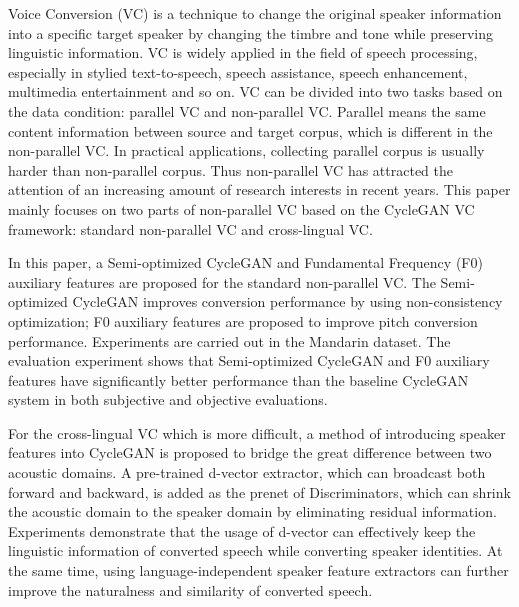 \begin{enabstract}
  Voice Conversion (VC) is a technique to change the original speaker information 
  into a specific target speaker by changing the timbre and tone while preserving 
  linguistic information. VC is widely applied in the field of speech processing, 
  especially in stylied text-to-speech, speech assistance, speech enhancement, 
  multimedia entertainment and so on. VC can be divided into two tasks based on the 
  data condition: parallel VC and non-parallel VC. Parallel means the same content
  information between source and target corpus, which is different in the non-parallel VC.
  In practical applications, collecting parallel corpus is usually harder than non-parallel
  corpus. Thus non-parallel VC has attracted the attention of an increasing amount of research 
  interests in recent years. This paper mainly focuses on two parts of non-parallel VC based
  on the CycleGAN VC framework: standard non-parallel VC and cross-lingual VC.

  In this paper, a Semi-optimized CycleGAN and Fundamental Frequency (F0) auxiliary features are
  proposed for the standard non-parallel VC. The Semi-optimized CycleGAN improves conversion 
  performance by using non-consistency optimization; F0 auxiliary features are proposed 
  to improve pitch conversion performance. Experiments are carried out in the Mandarin dataset. 
  The evaluation experiment shows that Semi-optimized CycleGAN and F0 auxiliary features have 
  significantly better performance than the baseline CycleGAN system in both subjective and objective
  evaluations.

  For the cross-lingual VC which is more difficult, a method of introducing speaker features into 
  CycleGAN is proposed to bridge the great difference between two acoustic domains. A pre-trained d-vector 
  extractor, which can broadcast both forward and backward, is added as the prenet of Discriminators, 
  which can shrink the acoustic domain to the speaker domain by eliminating residual information.
  Experiments demonstrate that the usage of d-vector can effectively keep the linguistic
  information of converted speech while converting speaker identities. At the same time, 
  using language-independent speaker feature extractors can further improve the naturalness and similarity 
  of converted speech.


\end{enabstract}
